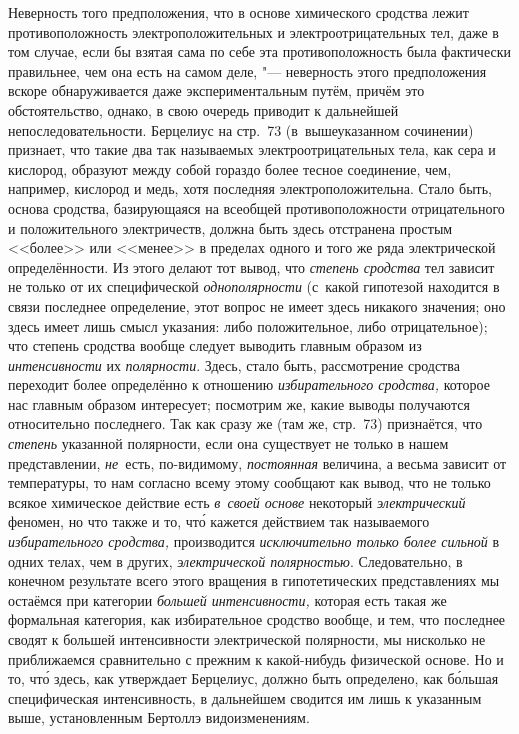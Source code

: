 Неверность того предположения, что в основе химического сродства лежит
противоположность электроположительных и электроотрицательных тел, даже в том
случае, если бы взятая сама по себе эта противоположность была фактически
правильнее, чем она есть на самом деле, "--- неверность этого предположения
вскоре обнаруживается даже экспериментальным путём, причём это обстоятельство,
однако, в свою очередь приводит к дальнейшей непоследовательности. Берцелиус на
стр.~73 (в~вышеуказанном сочинении) признает, что такие два так называемых
электроотрицательных тела, как сера и кислород, образуют между собой гораздо
более тесное соединение, чем, например, кислород и медь, хотя последняя
электроположительна. Стало быть, основа сродства, базирующаяся на всеобщей
противоположности отрицательного и положительного электричеств, должна быть
здесь отстранена простым <<более>> или <<менее>> в пределах
одного и того же ряда электрической определённости. Из этого делают тот вывод,
что {\em степень сродства} тел зависит не только от их специфической
{\em однополярности} (с~какой гипотезой находится в связи последнее
определение, этот вопрос не имеет здесь никакого значения; оно здесь имеет лишь
смысл указания: либо положительное, либо отрицательное); что
степень сродства вообще следует выводить главным образом из {\em интенсивности} их
{\em полярности}. Здесь, стало быть, рассмотрение сродства переходит
более определённо к отношению {\em избирательного сродства,} которое нас
главным образом интересует; посмотрим же, какие выводы получаются относительно
последнего. Так как сразу же (там же, стр.~73) признаётся, что {\em степень}
указанной полярности, если она существует не только в нашем представлении,
{\em не}~есть, по-видимому, {\em постоянная} величина, а весьма зависит от
температуры, то нам согласно всему этому сообщают как вывод, что не только
всякое химическое действие есть {\em в~своей основе} некоторый
{\em электрический} феномен, но что также и то, чт\'{о} кажется действием так
называемого {\em избирательного сродства,} производится
{\em исключительно только более сильной} в одних телах, чем в других,
{\em электрической полярностью}. Следовательно, в конечном результате всего этого
вращения в гипотетических представлениях мы остаёмся при категории
{\em большей интенсивности,} которая есть такая же формальная категория,
как избирательное сродство вообще, и тем, что последнее сводят к большей
интенсивности электрической полярности, мы нисколько не приближаемся сравнительно
с прежним к какой-нибудь физической основе. Но и то, чт\'{о} здесь, как
утверждает Берцелиус, должно быть определено, как б\'{о}льшая специфическая
интенсивность, в дальнейшем сводится им лишь к указанным выше, установленным
Бертоллэ видоизменениям.

